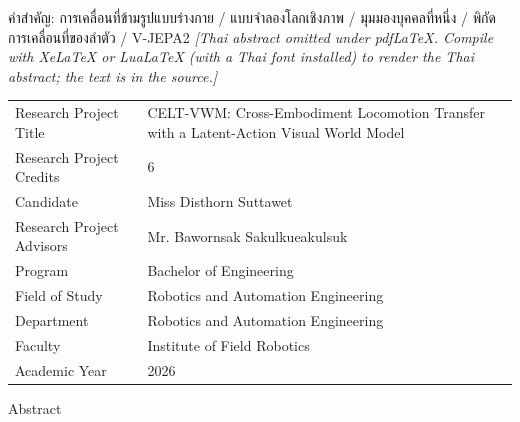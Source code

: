 \documentclass[12pt,a4paper,oneside]{report}
\begin{document}
{\vspace{4mm}
\noindent คำสำคัญ: การเคลื่อนที่ข้ามรูปแบบร่างกาย / แบบจำลองโลกเชิงภาพ / มุมมองบุคคลที่หนึ่ง / พิกัดการเคลื่อนที่ของลำตัว / V-JEPA2
}
\else
\noindent\emph{[Thai abstract omitted under pdfLaTeX. Compile with XeLaTeX or LuaLaTeX
(with a Thai font installed) to render the Thai abstract; the text is in the source.]}
\fi
\clearpage

\thispagestyle{fancy}
\noindent
\begin{tabular}{@{}p{4.8cm}p{9.7cm}@{}}
Research Project Title    & CELT-VWM: Cross-Embodiment Locomotion Transfer with a Latent-Action Visual World Model\\[2mm]
Research Project Credits  & 6\\[2mm]
Candidate                 & Miss Disthorn Suttawet\\[2mm]
Research Project Advisors & Mr. Bawornsak Sakulkueakulsuk\\[2mm]
Program                   & Bachelor of Engineering\\[2mm]
Field of Study            & Robotics and Automation Engineering\\[2mm]
Department                & Robotics and Automation Engineering\\[2mm]
Faculty                   & Institute of Field Robotics\\[2mm]
Academic Year             & 2026\\
\end{tabular}

\vspace{6mm}
\begin{center}Abstract\end{center}
\vspace{1mm}
\end{document}
